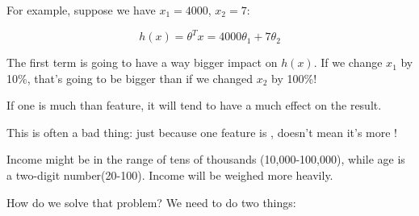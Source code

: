                 For example, suppose we have $x_1=4000$, $x_2=7$:

                \begin{equation}
                    h(x) = \theta^Tx = 4000\theta_1 + 7\theta_2
                \end{equation}

                The first term is going to have a way bigger impact on $h(x)$. If we change $x_1$ by 10\%, that's going to be bigger than if we changed $x_2$ by 100\%!
                    \\
    
                \begin{concept}
                    If one  is much  than  feature, it will tend to have a much  effect on the result.

                    This is often a bad thing: just because one feature is , doesn't mean it's more !
                \end{concept}

                \miniex Income might be in the range of tens of thousands (10,000-100,000), while age is a two-digit number(20-100). Income will be weighed more heavily.

                How do we solve that problem? We need to do two things:


